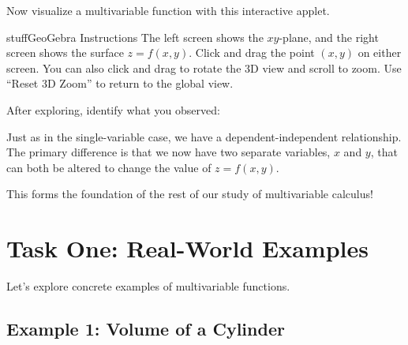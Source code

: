 \documentclass{ximera}
\begin{document}
\begin{problem}
Now visualize a multivariable function with this interactive applet.

\begin{expandable}{stuff}{GeoGebra Instructions}
    The left screen shows the $xy$-plane, and the right screen shows the surface $z = f(x,y)$. Click and drag the point $(x,y)$ on either screen. You can also click and drag to rotate the 3D view and scroll to zoom. Use ``Reset 3D Zoom'' to return to the global view.
\end{expandable}

\begin{center}
\end{center}

After exploring, identify what you observed:

\begin{selectAll}
\end{selectAll}

\begin{feedback}
Just as in the single-variable case, we have a dependent-independent relationship. The primary difference is that we now have two separate variables, $x$ and $y$, that can both be altered to change the value of $z = f(x,y)$.

This forms the foundation of the rest of our study of multivariable calculus!
\end{feedback}
\end{problem}

\section*{Task One: Real-World Examples}

Let's explore concrete examples of multivariable functions.

\subsection*{Example 1: Volume of a Cylinder}
\end{document}
